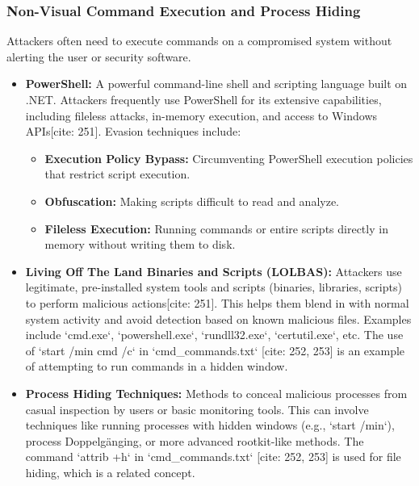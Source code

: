 \documentclass[11pt]{article}
\begin{document}
	\subsubsection{Non-Visual Command Execution and Process Hiding}
	Attackers often need to execute commands on a compromised system without alerting the user or security software.
	\begin{itemize}
		\item \textbf{PowerShell:} A powerful command-line shell and scripting language built on .NET. Attackers frequently use PowerShell for its extensive capabilities, including fileless attacks, in-memory execution, and access to Windows APIs[cite: 251]. Evasion techniques include:
		\begin{itemize}
			\item \textbf{Execution Policy Bypass:} Circumventing PowerShell execution policies that restrict script execution.
			\item \textbf{Obfuscation:} Making scripts difficult to read and analyze.
			\item \textbf{Fileless Execution:} Running commands or entire scripts directly in memory without writing them to disk.
		\end{itemize}
		\item \textbf{Living Off The Land Binaries and Scripts (LOLBAS):} Attackers use legitimate, pre-installed system tools and scripts (binaries, libraries, scripts) to perform malicious actions[cite: 251]. This helps them blend in with normal system activity and avoid detection based on known malicious files. Examples include `cmd.exe`, `powershell.exe`, `rundll32.exe`, `certutil.exe`, etc. The use of `start /min cmd /c` in `cmd_commands.txt` [cite: 252, 253] is an example of attempting to run commands in a hidden window.
		\item \textbf{Process Hiding Techniques:} Methods to conceal malicious processes from casual inspection by users or basic monitoring tools. This can involve techniques like running processes with hidden windows (e.g., `start /min`), process Doppelgänging, or more advanced rootkit-like methods. The command `attrib +h` in `cmd_commands.txt` [cite: 252, 253] is used for file hiding, which is a related concept.
	\end{itemize}
	
\end{document}
